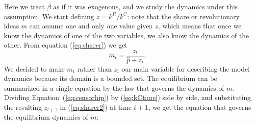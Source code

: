 Here we treat $\beta$ as if it was exogenous, and we study the dynamics under this assumption. We start defining $z=k^R/k^C$: note that the share or revolutionary ideas $m$ can assume one and only one value given $z$, which means that once we know the dynamics of one of the two variables, we also know the dynamics of the other. From equation (\ref{eq:sharer}) we get
\begin{equation}\label{eq:sharer2}
m_t=\frac{z_t}{\hat{p}+z_t}.
\end{equation}
 We decided to make $m_t$ rather than $z_t$ our main variable for describing the model dynamics because its domain is a bounded set.
The equilibrium  can be summarized in a single equation by the law that governs the dynamics of $m$.
Dividing Equation~(\ref{eq:censorhip}) by (\ref{eq:kCtime}) side by side, and substituting the resulting $z_{t+1}$ in (\ref{eq:sharer2}) at time $t+1$, we get the equation that governs the equilibrium dynamics of $m$:
